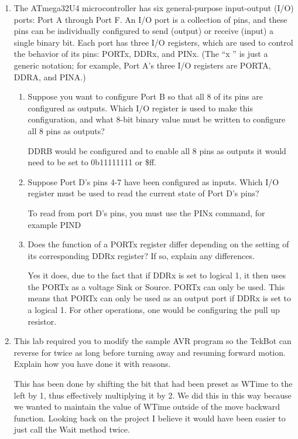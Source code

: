 \documentclass[12pt,letterpaper]{article}
\begin{document}
\begin{enumerate}
\begin{enumerate}
	\end{enumerate}
	\item 
	The ATmega32U4 microcontroller has six general-purpose input-output (I/O) ports: Port A through Port F. An I/O port is a collection of pins, and these pins can be individually configured to send (output) or receive (input) a single binary bit. Each port has three I/O registers, which are used to control the behavior of its pins: PORTx, DDRx, and PINx. (The
	“x ” is just a generic notation; for example, Port A’s three I/O registers are PORTA, DDRA, and PINA.)
	\begin{enumerate}
		\item 
		Suppose you want to configure Port B so that all 8 of its pins are configured as outputs. Which I/O register is used to make this configuration, and what 8-bit binary value must be written to configure all 8 pins as outputs?
		
		DDRB would be configured and to enable all 8 pins as outputs it would need to be set to 0b11111111 or \$ff.
		\item 
		Suppose Port D’s pins 4-7 have been configured as inputs. Which I/O register must be used to read the current state of Port D’s pins?
		
		To read from port D's pins, you must use the PINx command, for example PIND
		\item 
		Does the function of a PORTx register differ depending on the setting of its corresponding DDRx register? If so, explain any differences.
		
		Yes it does, due to the fact that if DDRx is set to logical 1, it then uses the PORTx as a voltage Sink or Source. PORTx can only be used. This means that PORTx can only be used as an output port if DDRx is set to a logical 1. For other operations, one would be configuring the pull up resistor.
	\end{enumerate}


    \item
	This lab required you to modify the sample AVR program so the TekBot can reverse for twice as long before turning away and resuming forward motion. Explain how you have done it with reasons.
	
	This has been done by shifting the bit that had been preset as WTime to the left by 1, thus effectively multiplying it by 2. We did this in this way because we wanted to maintain the value of WTime outside of the move backward function. Looking back on the project I believe it would have been easier to just call the Wait method twice.
	

\end{enumerate}
\end{document}
